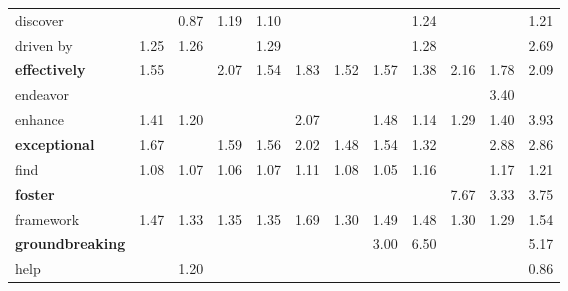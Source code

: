 \begin{tabular}{|l|c|c|c|c|c|c|c|c|c|c|c|}
discover &  & \cellcolor{red!27} 0.87 & \cellcolor{green!9} 1.19 & \cellcolor{green!5} 1.10 &  &  &  & \cellcolor{green!12} 1.24 &  &  & \cellcolor{green!10} 1.21 \\
driven by & \cellcolor{green!12} 1.25 & \cellcolor{green!12} 1.26 &  & \cellcolor{green!14} 1.29 &  &  &  & \cellcolor{green!13} 1.28 &  &  & \cellcolor{green!55} 2.69 \\
\textbf{effectively} & \cellcolor{green!24} 1.55 &  & \cellcolor{green!40} 2.07 & \cellcolor{green!24} 1.54 & \cellcolor{green!33} 1.83 & \cellcolor{green!23} 1.52 & \cellcolor{green!25} 1.57 & \cellcolor{green!17} 1.38 & \cellcolor{green!42} 2.16 & \cellcolor{green!32} 1.78 & \cellcolor{green!41} 2.09 \\
endeavor &  &  &  &  &  &  &  &  &  & \cellcolor{green!68} 3.40 &  \\
enhance & \cellcolor{green!19} 1.41 & \cellcolor{green!10} 1.20 &  &  & \cellcolor{green!40} 2.07 &  & \cellcolor{green!21} 1.48 & \cellcolor{green!7} 1.14 & \cellcolor{green!14} 1.29 & \cellcolor{green!18} 1.40 & \cellcolor{green!76} 3.93 \\
\textbf{exceptional} & \cellcolor{green!28} 1.67 &  & \cellcolor{green!25} 1.59 & \cellcolor{green!24} 1.56 & \cellcolor{green!39} 2.02 & \cellcolor{green!21} 1.48 & \cellcolor{green!24} 1.54 & \cellcolor{green!15} 1.32 &  & \cellcolor{green!59} 2.88 & \cellcolor{green!58} 2.86 \\
find & \cellcolor{green!4} 1.08 & \cellcolor{green!3} 1.07 & \cellcolor{green!3} 1.06 & \cellcolor{green!3} 1.07 & \cellcolor{green!5} 1.11 & \cellcolor{green!4} 1.08 & \cellcolor{green!2} 1.05 & \cellcolor{green!8} 1.16 &  & \cellcolor{green!8} 1.17 & \cellcolor{green!10} 1.21 \\
\textbf{foster} &  &  &  &  &  &  &  &  & \cellcolor{green!100} 7.67 & \cellcolor{green!67} 3.33 & \cellcolor{green!73} 3.75 \\
framework & \cellcolor{green!21} 1.47 & \cellcolor{green!15} 1.33 & \cellcolor{green!16} 1.35 & \cellcolor{green!16} 1.35 & \cellcolor{green!29} 1.69 & \cellcolor{green!14} 1.30 & \cellcolor{green!22} 1.49 & \cellcolor{green!21} 1.48 & \cellcolor{green!14} 1.30 & \cellcolor{green!14} 1.29 & \cellcolor{green!24} 1.54 \\
\textbf{groundbreaking} &  &  &  &  &  &  & \cellcolor{green!61} 3.00 & \cellcolor{green!100} 6.50 &  &  & \cellcolor{green!91} 5.17 \\
help &  & \cellcolor{green!10} 1.20 &  &  &  &  &  &  &  &  & \cellcolor{red!29} 0.86 \\

\end{tabular}
